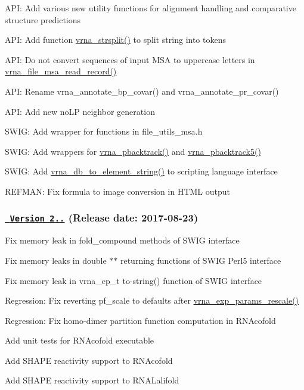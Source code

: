 \begin{DoxyItemize}
\item A\+PI\+: Add various new utility functions for alignment handling and comparative structure predictions
\item A\+PI\+: Add function \mbox{\hyperlink{group__string__utils_gac632775617f4b2df096bfe8efb53d07f}{vrna\+\_\+strsplit()}} to split string into tokens
\item A\+PI\+: Do not convert sequences of input M\+SA to uppercase letters in \mbox{\hyperlink{group__file__formats__msa_gad4203a438622b2df7bc2f16578d54799}{vrna\+\_\+file\+\_\+msa\+\_\+read\+\_\+record()}}
\item A\+PI\+: Rename vrna\+\_\+annotate\+\_\+bp\+\_\+covar() and vrna\+\_\+annotate\+\_\+pr\+\_\+covar()
\item A\+PI\+: Add new no\+LP neighbor generation
\item S\+W\+IG\+: Add wrapper for functions in file\+\_\+utils\+\_\+msa.\+h
\item S\+W\+IG\+: Add wrappers for \mbox{\hyperlink{group__subopt__stochbt_ga594844ac73c4e66e00d6791b31540634}{vrna\+\_\+pbacktrack()}} and \mbox{\hyperlink{group__subopt__stochbt_ga72ebbe45bcbce147a12f27f62b38db78}{vrna\+\_\+pbacktrack5()}}
\item S\+W\+IG\+: Add \mbox{\hyperlink{group__struct__utils__dot__bracket_ga45360c09fb6d04d96e42dcccbb66015b}{vrna\+\_\+db\+\_\+to\+\_\+element\+\_\+string()}} to scripting language interface
\item R\+E\+F\+M\+AN\+: Fix formula to image conversion in H\+T\+ML output
\end{DoxyItemize}

\subsubsection*{\href{https://github.com/ViennaRNA/ViennaRNA/compare/v2.4.0...v2.4.1}{\texttt{ Version 2..}} (Release date\+: 2017-\/08-\/23)}


\begin{DoxyItemize}
\item Fix memory leak in fold\+\_\+compound methods of S\+W\+IG interface
\item Fix memory leaks in double $\ast$$\ast$ returning functions of S\+W\+IG Perl5 interface
\item Fix memory leak in vrna\+\_\+ep\+\_\+t to-\/string() function of S\+W\+IG interface
\item Regression\+: Fix reverting pf\+\_\+scale to defaults after \mbox{\hyperlink{group__energy__parameters_gad607bc3a5b5da16400e2ca4ea5560233}{vrna\+\_\+exp\+\_\+params\+\_\+rescale()}}
\item Regression\+: Fix homo-\/dimer partition function computation in R\+N\+Acofold
\item Add unit tests for R\+N\+Acofold executable
\item Add S\+H\+A\+PE reactivity support to R\+N\+Acofold
\item Add S\+H\+A\+PE reactivity support to R\+N\+A\+Lalifold
\end{DoxyItemize}

